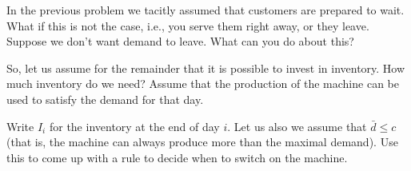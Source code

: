 \begin{exercise}
  In the previous problem we tacitly assumed that customers are
  prepared to wait.  What if this is not the case, i.e., you serve
  them right away, or they leave. Suppose we don't want demand to
  leave. What can you do about this?

\end{exercise}

\begin{exercise}
  So, let us assume for the remainder that it is possible to invest in
  inventory. How much inventory do we need? Assume that the production
  of the machine can be used to satisfy the demand for that day. 

\end{exercise}

\begin{exercise}
  Write $I_i$ for the inventory at the end of day $i$.  
  Let us also we assume that $\bar d \leq c$ (that is, the machine can
  always produce more than the maximal demand).  Use this to come up
  with a rule to decide when to switch on the machine.

\end{exercise}

